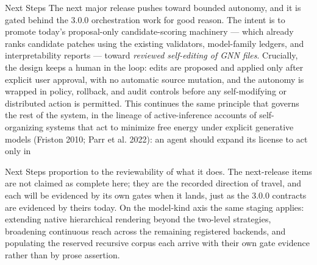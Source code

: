 \documentclass[
  ignorenonframetext,
]{beamer}
\begin{document}
\begin{frame}[allowframebreaks]{Next Steps}
The next major release pushes toward bounded autonomy, and it is gated
behind the 3.0.0 orchestration work for good reason. The intent is to
promote today's proposal-only candidate-scoring machinery --- which
already ranks candidate patches using the existing validators,
model-family ledgers, and interpretability reports --- toward
\emph{reviewed self-editing of GNN files}. Crucially, the design keeps a
human in the loop: edits are proposed and applied only after explicit
user approval, with no automatic source mutation, and the autonomy is
wrapped in policy, rollback, and audit controls before any
self-modifying or distributed action is permitted. This continues the
same principle that governs the rest of the system, in the lineage of
active-inference accounts of self-organizing systems that act to
minimize free energy under explicit generative models (Friston 2010;
Parr et al. 2022): an agent should expand its license to act only in
\end{frame}

\begin{frame}[allowframebreaks]{Next Steps}
proportion to the reviewability of what it does. The next-release items
are not claimed as complete here; they are the recorded direction of
travel, and each will be evidenced by its own gates when it lands, just
as the 3.0.0 contracts are evidenced by theirs today. On the model-kind
axis the same staging applies: extending native hierarchical rendering
beyond the two-level strategies, broadening continuous reach across the
remaining registered backends, and populating the reserved recursive
corpus each arrive with their own gate evidence rather than by prose
assertion.
\end{frame}
\end{document}
